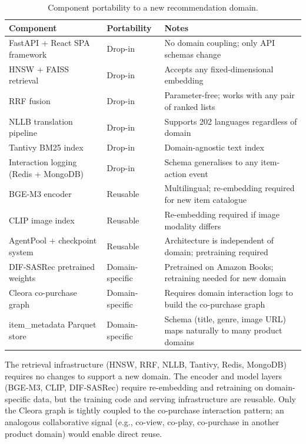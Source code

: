 \begin{table}[htbp]
\centering
\caption{Component portability to a new recommendation domain.}
\label{tab:generalisation}
\begin{tabular}{p{4.0cm} p{2.0cm} p{6.5cm}}
\hline
\textbf{Component} & \textbf{Portability} & \textbf{Notes} \\
\hline
FastAPI + React SPA framework & Drop-in & No domain coupling; only API schemas change \\
HNSW + FAISS retrieval        & Drop-in & Accepts any fixed-dimensional embedding \\
RRF fusion                    & Drop-in & Parameter-free; works with any pair of ranked lists \\
NLLB translation pipeline     & Drop-in & Supports 202 languages regardless of domain \\
Tantivy BM25 index            & Drop-in & Domain-agnostic text index \\
Interaction logging (Redis + MongoDB) & Drop-in & Schema generalises to any item-action event \\
BGE-M3 encoder                & Reusable & Multilingual; re-embedding required for new item catalogue \\
CLIP image index               & Reusable & Re-embedding required if image modality differs \\
AgentPool + checkpoint system  & Reusable & Architecture is independent of domain; pretraining required \\
DIF-SASRec pretrained weights  & Domain-specific & Pretrained on Amazon Books; retraining needed for new domain \\
Cleora co-purchase graph       & Domain-specific & Requires domain interaction logs to build the co-purchase graph \\
item\_metadata Parquet store   & Domain-specific & Schema (title, genre, image URL) maps naturally to many product domains \\
\hline
\end{tabular}
\end{table}

The retrieval infrastructure (HNSW, RRF, NLLB, Tantivy, Redis, MongoDB) requires no changes to support a new domain.
The encoder and model layers (BGE-M3, CLIP, DIF-SASRec) require re-embedding and retraining on domain-specific data, but the training code and serving infrastructure are reusable.
Only the Cleora graph is tightly coupled to the co-purchase interaction pattern; an analogous collaborative signal (e.g., co-view, co-play, co-purchase in another product domain) would enable direct reuse.


